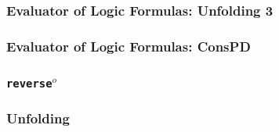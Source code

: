 \documentclass[xcolor=table]{beamer}
\begin{document}
\begin{frame}[fragile]
  \transwipe[direction=90]
  \frametitle{Evaluator of Logic Formulas: Unfolding 3}

\begin{center}
  
\end{center}
\end{frame}

\begin{frame}[fragile]
  \transwipe[direction=90]
  \frametitle{Evaluator of Logic Formulas: ConsPD}

\begin{center}
  
\end{center}
\end{frame}

\begin{frame}[fragile]
  \transwipe[direction=90]
  \frametitle{\texttt{reverse}$^o$}

\begin{center}
  
\end{center}


\end{frame}

\begin{frame}[fragile]
  \transwipe[direction=90]
  \frametitle{Unfolding}

\begin{center}
  
\end{center}

\begin{center}
  
\end{center}

\end{frame}
\end{document}
